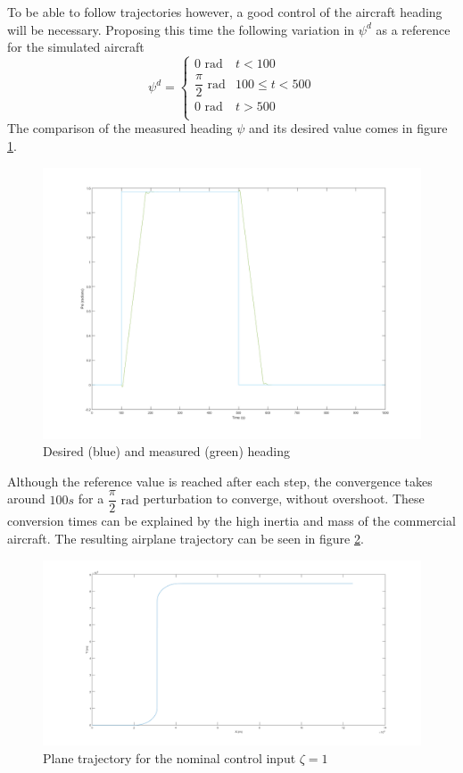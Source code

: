 To be able to follow trajectories however, a good control of the aircraft heading will be necessary. Proposing this time the following variation in $\psi^d$ as a reference for the simulated aircraft
\begin{equation}
\psi^d = \begin{cases}
0\text{ rad} & t < 100\\
\dfrac{\pi}{2}\text{ rad} & 100 \leq t < 500\\
0\text{ rad} & t > 500 \\
\end{cases}
\label{eq:test_traj}
\end{equation}
The comparison of the measured heading $\psi$ and its desired value comes in figure \ref{fig:heading_test}.
\begin{figure}[H]
\centering
\includegraphics[width=\textwidth]{Figures/Results/heading_test.png}
\caption[Desired and measured heading]{Desired (blue) and measured (green) heading}
\label{fig:heading_test}
\end{figure}

Although the reference value is reached after each step, the convergence takes around $100s$ for a $\dfrac{\pi}{2}\text{ rad}$ perturbation to converge, without overshoot. These conversion times can be explained by the high inertia and mass of the commercial aircraft. The resulting airplane trajectory can be seen in figure \ref{fig:trajectory}.

\begin{figure}[H]
\centering
\includegraphics[width=\textwidth]{Figures/Results/trajectory.png}
\caption[Plane trajectory]{Plane trajectory for the nominal control input $\zeta=1$}
\label{fig:trajectory}
\end{figure}

